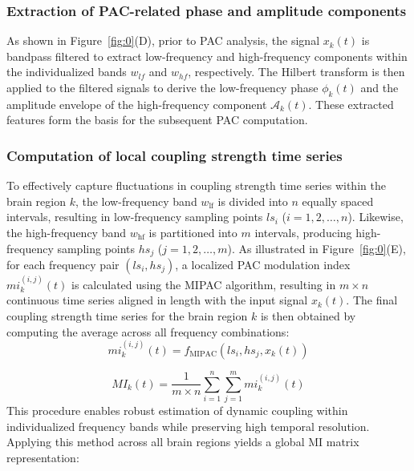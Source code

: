 \documentclass[lettersize,journal]{IEEEtran}
\begin{document}
\subsubsection{Extraction of PAC-related phase and amplitude components}

As shown in Figure~\ref{fig:0}(D), prior to PAC analysis, the signal \( x_k(t) \) is bandpass filtered to extract low-frequency and high-frequency components within the individualized bands \( w_{lf} \) and \( w_{hf} \), respectively. The Hilbert transform is then applied to the filtered signals to derive the low-frequency phase \( \phi_k(t) \) and the amplitude envelope of the high-frequency component \( \mathcal{A}_k(t) \). These extracted features form the basis for the subsequent PAC computation.

\subsubsection{Computation of local coupling strength time series}

To effectively capture fluctuations in coupling strength time series within the brain region \( k \), the low-frequency band \( w_{\text{lf}} \) is divided into \( n \) equally spaced intervals, resulting in low-frequency sampling points \( ls_i \) (\( i = 1, 2, \dots, n \)). Likewise, the high-frequency band \( w_{\text{hf}} \) is partitioned into \( m \) intervals, producing high-frequency sampling points \( hs_j \) (\( j = 1, 2, \dots, m \)).
As illustrated in Figure~\ref{fig:0}(E), for each frequency pair \( (ls_i, hs_j) \), a localized PAC modulation index \( mi_k^{(i,j)}(t) \) is calculated using the MIPAC algorithm, resulting in \( m \times n \) continuous time series aligned in length with the input signal \( x_k(t) \). The final coupling strength time series for the brain region \( k \) is then obtained by computing the average across all frequency combinations:
\begin{equation}
mi_k^{(i,j)}(t) = f_{\text{MIPAC}}(ls_i, hs_j, x_k(t))
\label{11}
\end{equation}

\begin{equation}
MI_k(t) = \frac{1}{m \times n} \sum_{i=1}^{n} \sum_{j=1}^{m} mi_k^{(i,j)}(t)
\label{12}
\end{equation}
This procedure enables robust estimation of dynamic coupling within individualized frequency bands while preserving high temporal resolution. Applying this method across all brain regions yields a global MI matrix representation:
\end{document}
